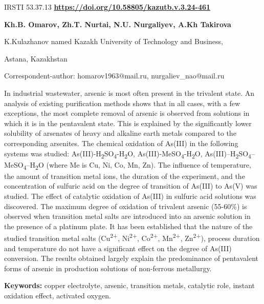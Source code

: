 \newpage
IRSTI 53.37.13
\hfill {\bfseries \href{https://doi.org/10.58805/kazutb.v.3.24-461}{https://doi.org/10.58805/kazutb.v.3.24-461}}


\begin{center}
{\bfseries Kh.B. Omarov\envelope, Zh.T. Nurtai, N.U.
Nurgaliyev\envelope, A.Kh Takirova}

K.Kulazhanov named Kazakh University of Technology and Business,

Astana, Kazakhstan
\end{center}
\envelope Correspondent-author: homarov1963@mail.ru,
nurgaliev\_nao@mail.ru

In industrial wastewater, arsenic is most often present in the trivalent
state. An analysis of existing purification methods shows that in all
cases, with a few exceptions, the most complete removal of arsenic is
observed from solutions in which it is in the pentavalent state. This is
explained by the significantly lower solubility of arsenates of heavy
and alkaline earth metals compared to the corresponding arsenites. The
chemical oxidation of As(III) in the following systems was studied:
As(III)-H\textsubscript{2}SO\textsubscript{4}-H\textsubscript{2}O,
As(III)-MeSO\textsubscript{4}-H\textsubscript{2}O,
As(III)--H\textsubscript{2}SO\textsubscript{4}--MeSO\textsubscript{4}--H\textsubscript{2}O
(where Me is Cu, Ni, Co, Mn, Zn). The influence of temperature, the
amount of transition metal ions, the duration of the experiment, and the
concentration of sulfuric acid on the degree of transition of As(III) to
As(V) was studied. The effect of catalytic oxidation of As(III) in
sulfuric acid solutions was discovered. The maximum degree of oxidation
of trivalent arsenic (55-60\%) is observed when transition metal salts
are introduced into an arsenic solution in the presence of a platinum
plate. It has been established that the nature of the studied transition
metal salts (Cu\textsuperscript{2+}, Ni\textsuperscript{2+},
Co\textsuperscript{2+}, Mn\textsuperscript{2+}, Zn\textsuperscript{2+}),
process duration and temperature do not have a significant effect on the
degree of As(III) conversion. The results obtained largely explain the
predominance of pentavalent forms of arsenic in production solutions of
non-ferrous metallurgy.

{\bfseries Keywords:} copper electrolyte, arsenic, transition metals,
catalytic role, instant oxidation effect, activated oxygen.

